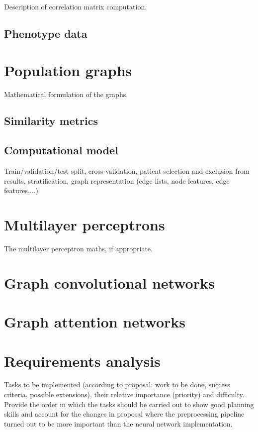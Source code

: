 Description of correlation matrix computation.

\subsection{Phenotype data}

\section{Population graphs}
Mathematical formulation of the graphs.

\subsection{Similarity metrics}

\subsection{Computational model}
Train/validation/test split, cross-validation, patient selection and exclusion from results, stratification, graph representation (edge lists, node features, edge features,...)

\section{Multilayer perceptrons}
The multilayer perceptron maths, if appropriate.

\section{Graph convolutional networks}

\section{Graph attention networks}

\section{Requirements analysis}

Tasks to be implemented (according to proposal: work to be done, success criteria, possible extensions), their relative importance (priority) and difficulty. Provide the order in which the tasks should be carried out to show good planning skills and account for the changes in proposal where the preprocessing pipeline turned out to be more important than the neural network implementation.

